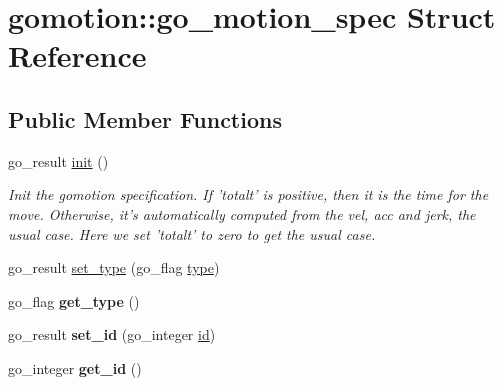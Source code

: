 \hypertarget{structgomotion_1_1go__motion__spec}{\section{gomotion\-:\-:go\-\_\-motion\-\_\-spec Struct Reference}
\label{structgomotion_1_1go__motion__spec}
}
\subsection*{Public Member Functions}
\begin{DoxyCompactItemize}
\item 
go\-\_\-result \hyperlink{structgomotion_1_1go__motion__spec_a8a2282df2425f0eb1f258d1d0fadff5a}{init} ()
\begin{DoxyCompactList}\small\item\em Init the gomotion specification. If 'totalt' is positive, then it is the time for the move. Otherwise, it's automatically computed from the vel, acc and jerk, the usual case. Here we set 'totalt' to zero to get the usual case. \end{DoxyCompactList}\item 
go\-\_\-result \hyperlink{structgomotion_1_1go__motion__spec_a65efbbc70caff991679bbdd49fc9ccb9}{set\-\_\-type} (go\-\_\-flag \hyperlink{structgomotion_1_1go__motion__spec_a186231a66a1f1f6d6628cd23baf60530}{type})
\item 
\hypertarget{structgomotion_1_1go__motion__spec_a2d7aaadc8a968d43b563d83ad4d52cb3}{go\-\_\-flag {\bfseries get\-\_\-type} ()}\label{structgomotion_1_1go__motion__spec_a2d7aaadc8a968d43b563d83ad4d52cb3}

\item 
\hypertarget{structgomotion_1_1go__motion__spec_af5bd0446eb32dd4dfe9ae8811f820909}{go\-\_\-result {\bfseries set\-\_\-id} (go\-\_\-integer \hyperlink{structgomotion_1_1go__motion__spec_a09732ca7aaddfa7a637f171766329931}{id})}\label{structgomotion_1_1go__motion__spec_af5bd0446eb32dd4dfe9ae8811f820909}

\item 
\hypertarget{structgomotion_1_1go__motion__spec_a2ed1b68537a42747a67507eba4757b4f}{go\-\_\-integer {\bfseries get\-\_\-id} ()}\label{structgomotion_1_1go__motion__spec_a2ed1b68537a42747a67507eba4757b4f}


\end{DoxyCompactItemize}
